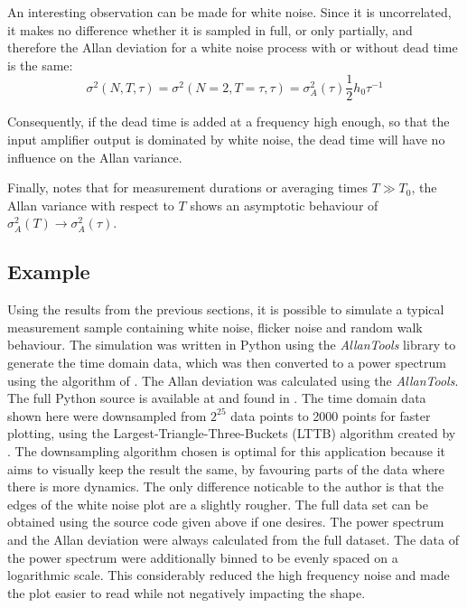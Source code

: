 An interesting observation can be made for white noise. Since it is uncorrelated, it makes no difference whether it is sampled in full, or only partially, and therefore the Allan deviation for a white noise process with or without dead time is the same:
\begin{equation}
    \sigma^2(N,T, \tau) = \sigma^2(N=2,T=\tau, \tau) = \sigma_A^2(\tau) \frac 1 2 h_0 \tau^{-1}
\end{equation}

Consequently, if the dead time is added at a frequency high enough, so that the input amplifier output is dominated by white noise, the dead time will have no influence on the Allan variance.

Finally, \citeauthor{psd_to_adev} \cite{psd_to_adev} notes that for measurement durations or averaging times $T \gg T_0$, the Allan variance with respect to $T$ shows an asymptotic behaviour of $\sigma_A^2(T) \to \sigma_A^2(\tau)$.

\clearpage
\subsection{Example}%
\label{sec:noise_example}
Using the results from the previous sections, it is possible to simulate a typical measurement sample containing white noise, flicker noise and random walk behaviour. The simulation was written in Python using the \textit{AllanTools} library \cite{allantools} to generate the time domain data, which was then converted to a power spectrum using the algorithm of \citeauthor{welch} \cite{welch}. The Allan deviation was calculated using the \textit{AllanTools}. The full Python source is available at \cite{supplemental_material} and found in . The time domain data shown here were downsampled from $2^{25}$ data points to \num{2000} points for faster plotting, using the Largest-Triangle-Three-Buckets (LTTB) algorithm created by \citeauthor{lttb} \cite{lttb}. The downsampling algorithm chosen is optimal for this application because it aims to visually keep the result the same, by favouring parts of the data where there is more dynamics. The only difference noticable to the author is that the edges of the white noise plot are a slightly rougher. The full data set can be obtained using the source code given above if one desires. The power spectrum and the Allan deviation were always calculated from the full dataset. The data of the power spectrum were additionally binned to be evenly spaced on a logarithmic scale. This considerably reduced the high frequency noise and made the plot easier to read while not negatively impacting the shape.

